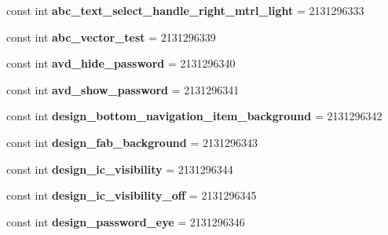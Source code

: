\begin{DoxyCompactItemize}
const int {\bfseries abc\+\_\+text\+\_\+select\+\_\+handle\+\_\+right\+\_\+mtrl\+\_\+light} = 2131296333
\item 
\mbox{\label{classst_delivery_1_1_resource_1_1_drawable_a7ed188e2f1285f2f356c67845f0f1d49}} 
const int {\bfseries abc\+\_\+vector\+\_\+test} = 2131296339
\item 
\mbox{\label{classst_delivery_1_1_resource_1_1_drawable_a4f31a357ec01b86e8371002049f99e31}} 
const int {\bfseries avd\+\_\+hide\+\_\+password} = 2131296340
\item 
\mbox{\label{classst_delivery_1_1_resource_1_1_drawable_a6d61fab12c12411c29085a7f5bc988fc}} 
const int {\bfseries avd\+\_\+show\+\_\+password} = 2131296341
\item 
\mbox{\label{classst_delivery_1_1_resource_1_1_drawable_ab64695cfc285a818d0aabfc7c7051eb1}} 
const int {\bfseries design\+\_\+bottom\+\_\+navigation\+\_\+item\+\_\+background} = 2131296342
\item 
\mbox{\label{classst_delivery_1_1_resource_1_1_drawable_ad2a02fd05aefd2d2193bd9cb205ea8e2}} 
const int {\bfseries design\+\_\+fab\+\_\+background} = 2131296343
\item 
\mbox{\label{classst_delivery_1_1_resource_1_1_drawable_a4a51c872eb9147dcc9f4141b1e8594d9}} 
const int {\bfseries design\+\_\+ic\+\_\+visibility} = 2131296344
\item 
\mbox{\label{classst_delivery_1_1_resource_1_1_drawable_aaeeefa26eaaed2347e3f5a3aced189ff}} 
const int {\bfseries design\+\_\+ic\+\_\+visibility\+\_\+off} = 2131296345
\item 
\mbox{\label{classst_delivery_1_1_resource_1_1_drawable_a24d4d1b9e7048835cd772fa262d2d0a8}} 
const int {\bfseries design\+\_\+password\+\_\+eye} = 2131296346
\item 
\mbox{\label{classst_delivery_1_1_resource_1_1_drawable_a52aed38bf445672852c4bb92240bf13f}} 

\end{DoxyCompactItemize}

